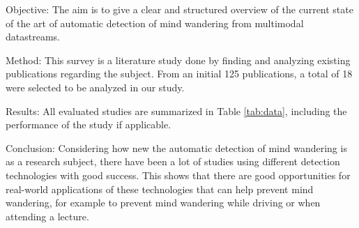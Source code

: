 Objective: The aim is to give a clear and structured overview of the current state of the art of automatic detection of mind wandering from multimodal datastreams.

Method: This survey is a literature study done by finding and analyzing existing publications regarding the subject. From an initial 125 publications, a total of 18 were selected to be analyzed in our study.

Results: All evaluated studies are summarized in Table \ref{tab:data}, including the performance of the study if applicable.

Conclusion: Considering how new the automatic detection of mind wandering is as a research subject, there have been a lot of studies using different detection technologies with good success. This shows that there are good opportunities for real-world applications of these technologies that can help prevent mind wandering, for example to prevent mind wandering while driving or when attending a lecture.